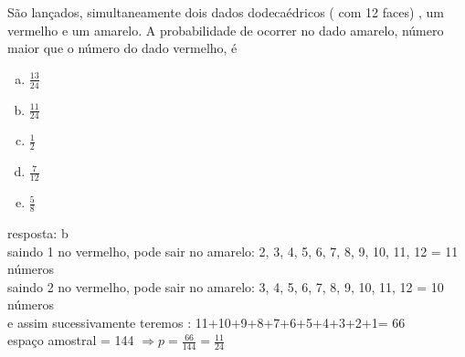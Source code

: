\begin{ex}
	São lançados, simultaneamente dois dados dodecaédricos ( com 12 faces) , um vermelho e um amarelo. A probabilidade de ocorrer no dado amarelo, número maior que o número do dado vermelho, é
    \begin{enumerate}[(a)]
    \item $\frac{13}{24}$
    \item $\frac{11}{24}$
    \item $\frac{1}{2}$
    \item $\frac{7}{12}$
    \item $\frac{5}{8}$
    \end{enumerate}
      \begin{sol}
        resposta: b \\
        saindo 1 no vermelho, pode sair no amarelo: 2, 3, 4, 5, 6, 7, 8, 9, 10, 11, 12 = 11 números\\
        saindo 2 no vermelho, pode sair no amarelo: 3, 4, 5, 6, 7, 8, 9, 10, 11, 12 = 10 números  \\
        e assim sucessivamente teremos : 11+10+9+8+7+6+5+4+3+2+1= 66 \\
        espaço amostral = 144 $\Longrightarrow p = \frac{66}{144}=\frac{11}{24}$
      \end{sol}
\end{ex}